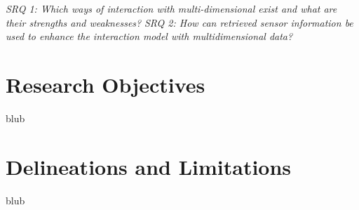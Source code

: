 \textit{SRQ 1: Which ways of interaction with multi-dimensional exist and what are their strengths and weaknesses?}
\newline
\textit{SRQ 2: How can retrieved sensor information be used to enhance the interaction model with multidimensional data?}




\section{Research Objectives}

blub






\section{Delineations and Limitations}

blub








